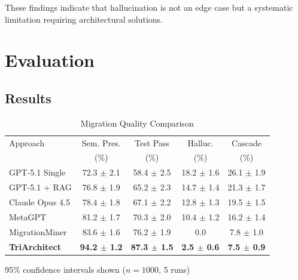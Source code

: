 \documentclass[10pt,conference]{IEEEtran}
\begin{document}
These findings indicate that hallucination is not an edge case but a systematic limitation requiring architectural solutions.






\section{Evaluation}

\subsection{Results}

\begin{table}[t]
\centering
\caption{Migration Quality Comparison}
\label{tab:results}
\begin{tabular}{@{}lcccc@{}}
\toprule
Approach & Sem. Pres. & Test Pass & Halluc. & Cascade \\
         & (\%)       & (\%)      & (\%)    & (\%)    \\
\midrule
GPT-5.1 Single    & 72.3 $\pm$ 2.1 & 58.4 $\pm$ 2.5 & 18.2 $\pm$ 1.6 & 26.1 $\pm$ 1.9 \\
GPT-5.1 + RAG     & 76.8 $\pm$ 1.9 & 65.2 $\pm$ 2.3 & 14.7 $\pm$ 1.4 & 21.3 $\pm$ 1.7 \\
Claude Opus 4.5   & 78.4 $\pm$ 1.8 & 67.1 $\pm$ 2.2 & 12.8 $\pm$ 1.3 & 19.5 $\pm$ 1.5 \\
MetaGPT           & 81.2 $\pm$ 1.7 & 70.3 $\pm$ 2.0 & 10.4 $\pm$ 1.2 & 16.2 $\pm$ 1.4 \\
MigrationMiner    & 83.6 $\pm$ 1.6 & 76.2 $\pm$ 1.9 & 0.0            & 7.8 $\pm$ 1.0  \\
\textbf{TriArchitect} & \textbf{94.2 $\pm$ 1.2} & \textbf{87.3 $\pm$ 1.5} & \textbf{2.5 $\pm$ 0.6} & \textbf{7.5 $\pm$ 0.9} \\
\bottomrule
\end{tabular}
\vspace{2pt}
\footnotesize{95\% confidence intervals shown ($n=1000$, 5 runs)}
\end{table}
\end{document}
